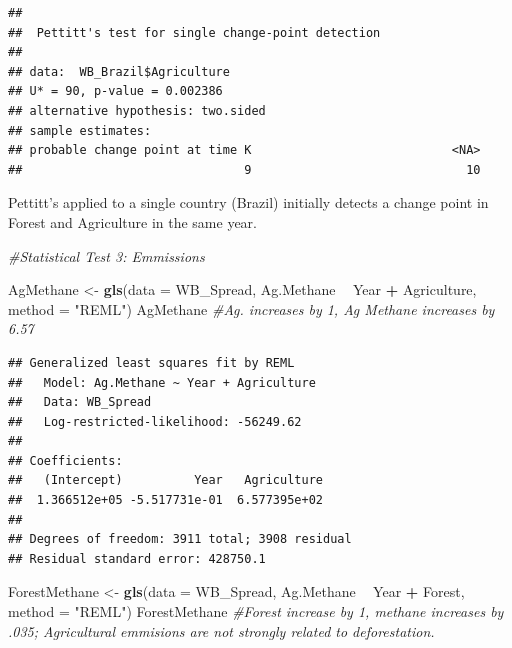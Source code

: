 \documentclass[12pt,]{article}
\newenvironment{Shaded}{\begin{snugshade}}{\end{snugshade}}
\newcommand{\KeywordTok}[1]{\textcolor[rgb]{0.13,0.29,0.53}{\textbf{#1}}}
\newcommand{\DataTypeTok}[1]{\textcolor[rgb]{0.13,0.29,0.53}{#1}}
\newcommand{\StringTok}[1]{\textcolor[rgb]{0.31,0.60,0.02}{#1}}
\newcommand{\CommentTok}[1]{\textcolor[rgb]{0.56,0.35,0.01}{\textit{#1}}}
\newcommand{\OperatorTok}[1]{\textcolor[rgb]{0.81,0.36,0.00}{\textbf{#1}}}
\newcommand{\NormalTok}[1]{#1}
\begin{document}
\begin{verbatim}
## 
##  Pettitt's test for single change-point detection
## 
## data:  WB_Brazil$Agriculture
## U* = 90, p-value = 0.002386
## alternative hypothesis: two.sided
## sample estimates:
## probable change point at time K                            <NA> 
##                               9                              10
\end{verbatim}

\begin{Shaded}
\end{Shaded}

Pettitt's applied to a single country (Brazil) initially detects a
change point in Forest and Agriculture in the same year.

\begin{Shaded}
\begin{Highlighting}[]
\CommentTok{#Statistical Test 3: Emmissions}

\NormalTok{AgMethane <-}\StringTok{ }\KeywordTok{gls}\NormalTok{(}\DataTypeTok{data =}\NormalTok{ WB_Spread,}
\NormalTok{                 Ag.Methane }\OperatorTok{~}\StringTok{ }\NormalTok{Year }\OperatorTok{+}\StringTok{ }\NormalTok{Agriculture,}
                 \DataTypeTok{method =} \StringTok{"REML"}\NormalTok{)}
\NormalTok{AgMethane }\CommentTok{#Ag. increases by 1, Ag Methane increases by 6.57}
\end{Highlighting}
\end{Shaded}

\begin{verbatim}
## Generalized least squares fit by REML
##   Model: Ag.Methane ~ Year + Agriculture 
##   Data: WB_Spread 
##   Log-restricted-likelihood: -56249.62
## 
## Coefficients:
##   (Intercept)          Year   Agriculture 
##  1.366512e+05 -5.517731e-01  6.577395e+02 
## 
## Degrees of freedom: 3911 total; 3908 residual
## Residual standard error: 428750.1
\end{verbatim}

\begin{Shaded}
\begin{Highlighting}[]
\NormalTok{ForestMethane <-}\StringTok{ }\KeywordTok{gls}\NormalTok{(}\DataTypeTok{data =}\NormalTok{ WB_Spread, }
\NormalTok{                  Ag.Methane }\OperatorTok{~}\StringTok{ }\NormalTok{Year }\OperatorTok{+}\StringTok{ }\NormalTok{Forest,}
                  \DataTypeTok{method =} \StringTok{"REML"}\NormalTok{)}
\NormalTok{ForestMethane }\CommentTok{#Forest increase by 1, methane increases by .035; Agricultural emmisions are not strongly related to deforestation. }
\end{Highlighting}
\end{Shaded}
\end{document}
